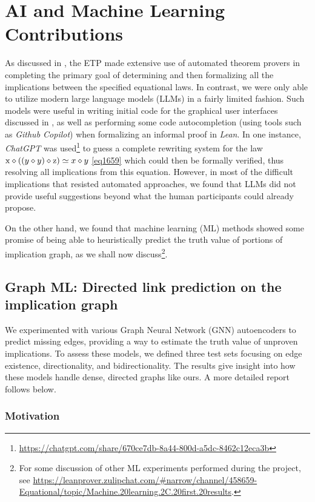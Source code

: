 \section{AI and Machine Learning Contributions}\label{ml-sec}

As discussed in , the ETP made extensive use of automated theorem provers in completing the primary goal of determining and then formalizing all the implications between the specified equational laws.  In contrast, we were only able to utilize modern large language models (LLMs) in a fairly limited fashion.  Such models were useful in writing initial code for the graphical user interfaces discussed in , as well as performing some code autocompletion (using tools such as \emph{Github Copilot}) when formalizing an informal proof in \emph{Lean}.  In one instance, \emph{ChatGPT} was used\footnote{\url{https://chatgpt.com/share/670ce7db-8a44-800d-a5dc-8462c12eca3b}} to guess a complete rewriting system for the law $\mathrm{x} \diamond ((y \diamond y) \diamond \mathrm{z}) \simeq x \diamond y$ \eqref{eq1659} which could then be formally verified, thus resolving all implications from this equation. However, in most of the difficult implications that resisted automated approaches, we found that LLMs did not provide useful suggestions beyond what the human participants could already propose.

On the other hand, we found that machine learning (ML) methods showed some promise of being able to heuristically predict the truth value of portions of implication graph, as we shall now discuss\footnote{For some discussion of other ML experiments performed during the project, see \url{https://leanprover.zulipchat.com/\#narrow/channel/458659-Equational/topic/Machine.20learning.2C.20first.20results}.}.

\subsection{Graph ML: Directed link prediction on the implication graph}
\label{sec:dlp}

We experimented with various Graph Neural Network (GNN) autoencoders to predict missing edges,
providing a way to estimate the truth value of unproven implications. To assess these models,
we defined three test sets focusing on edge existence, directionality, and bidirectionality.
The results give insight into how these models handle dense, directed graphs like ours.
A more detailed report follows below.


\subsubsection{Motivation}

